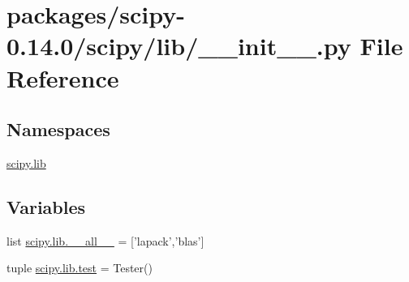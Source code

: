 \hypertarget{packages_2scipy-0_814_80_2scipy_2lib_2____init_____8py}{}\section{packages/scipy-\/0.14.0/scipy/lib/\+\_\+\+\_\+init\+\_\+\+\_\+.py File Reference}
\label{packages_2scipy-0_814_80_2scipy_2lib_2____init_____8py}
\subsection*{Namespaces}
\begin{DoxyCompactItemize}
\item 
 \hyperlink{namespacescipy_1_1lib}{scipy.\+lib}
\end{DoxyCompactItemize}
\subsection*{Variables}
\begin{DoxyCompactItemize}
\item 
list \hyperlink{namespacescipy_1_1lib_a32d465836b84be516f414d054bdf2745}{scipy.\+lib.\+\_\+\+\_\+all\+\_\+\+\_\+} = \mbox{[}'lapack','blas'\mbox{]}
\item 
tuple \hyperlink{namespacescipy_1_1lib_a675252b0c93dc0d6ab96541d2bf65291}{scipy.\+lib.\+test} = Tester()
\end{DoxyCompactItemize}
